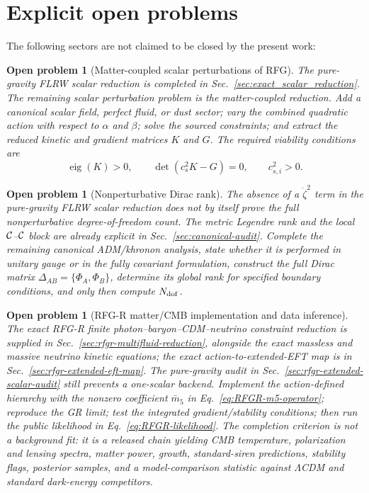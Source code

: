 \documentclass[11pt,a4paper]{article}
\newtheorem{openproblem}[axiom]{Open problem}
\begin{document}
\section{Explicit open problems}

The following sectors are not claimed to be closed by the present work:

\begin{openproblem}[Matter-coupled scalar perturbations of RFG]
The pure-gravity FLRW scalar reduction is completed in Sec.~\ref{sec:exact_scalar_reduction}. The remaining scalar perturbation problem is the matter-coupled reduction. Add a canonical scalar field, perfect fluid, or dust sector; vary the combined quadratic action with respect to \(\alpha\) and \(\beta\); solve the sourced constraints; and extract the reduced kinetic and gradient matrices \(K\) and \(G\). The required viability conditions are
\[
\operatorname{eig}(K)>0,\qquad
\det(c_s^2K-G)=0,\qquad c_{s,i}^2>0.
\]
\end{openproblem}

\begin{openproblem}[Nonperturbative Dirac rank]
The absence of a \(\dot\zeta^2\) term in the pure-gravity FLRW scalar reduction does not by itself prove the full nonperturbative degree-of-freedom count. The metric Legendre rank and the local \({\cal C}\)--\({\cal C}\) block are already explicit in Sec.~\ref{sec:canonical-audit}. Complete the remaining canonical ADM/khronon analysis, state whether it is performed in unitary gauge or in the fully covariant formulation, construct the full Dirac matrix \(\Delta_{AB}=\{\Phi_A,\Phi_B\}\), determine its global rank for specified boundary conditions, and only then compute \(N_{\rm dof}\).
\end{openproblem}

\begin{openproblem}[RFG-R matter/CMB implementation and data inference]
The exact RFG-R finite photon--baryon--CDM--neutrino constraint reduction is supplied in Sec.~\ref{sec:rfgr-multifluid-reduction}, alongside the exact massless and massive neutrino kinetic equations; the exact action-to-extended-EFT map is in Sec.~\ref{sec:rfgr-extended-eft-map}. The pure-gravity audit in Sec.~\ref{sec:rfgr-extended-scalar-audit} still prevents a one-scalar backend. Implement the action-defined hierarchy with the nonzero coefficient \(\bar m_5\) in Eq.~\eqref{eq:RFGR-m5-operator}; reproduce the GR limit; test the integrated gradient/stability conditions; then run the public likelihood in Eq.~\eqref{eq:RFGR-likelihood}. The completion criterion is not a background fit: it is a released chain yielding CMB temperature, polarization and lensing spectra, matter power, growth, standard-siren predictions, stability flags, posterior samples, and a model-comparison statistic against \(\Lambda\)CDM and standard dark-energy competitors.
\end{openproblem}
\end{document}
